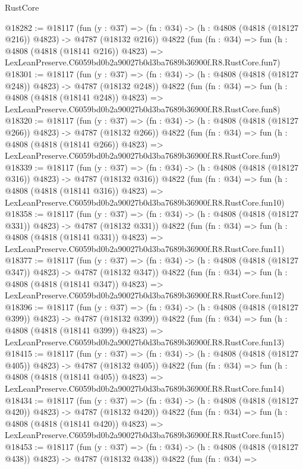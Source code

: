 \begin{lexlean}{RustCore}
\begin{coremodule}
@18282 := @18117
    (fun (y : @37) => (fn : @34) -> (h : @4808 (@4818 (@18127 @216)) @4823) -> @4787 (@18132 @216))
    @4822
    (fun (fn : @34) =>
    fun (h : @4808 (@4818 (@18141 @216)) @4823) =>
    LexLeanPreserve.C6059bd0b2a90027b0d3ba7689b36900f.R8.RustCore.fun7)
@18301 := @18117
    (fun (y : @37) => (fn : @34) -> (h : @4808 (@4818 (@18127 @248)) @4823) -> @4787 (@18132 @248))
    @4822
    (fun (fn : @34) =>
    fun (h : @4808 (@4818 (@18141 @248)) @4823) =>
    LexLeanPreserve.C6059bd0b2a90027b0d3ba7689b36900f.R8.RustCore.fun8)
@18320 := @18117
    (fun (y : @37) => (fn : @34) -> (h : @4808 (@4818 (@18127 @266)) @4823) -> @4787 (@18132 @266))
    @4822
    (fun (fn : @34) =>
    fun (h : @4808 (@4818 (@18141 @266)) @4823) =>
    LexLeanPreserve.C6059bd0b2a90027b0d3ba7689b36900f.R8.RustCore.fun9)
@18339 := @18117
    (fun (y : @37) => (fn : @34) -> (h : @4808 (@4818 (@18127 @316)) @4823) -> @4787 (@18132 @316))
    @4822
    (fun (fn : @34) =>
    fun (h : @4808 (@4818 (@18141 @316)) @4823) =>
    LexLeanPreserve.C6059bd0b2a90027b0d3ba7689b36900f.R8.RustCore.fun10)
@18358 := @18117
    (fun (y : @37) => (fn : @34) -> (h : @4808 (@4818 (@18127 @331)) @4823) -> @4787 (@18132 @331))
    @4822
    (fun (fn : @34) =>
    fun (h : @4808 (@4818 (@18141 @331)) @4823) =>
    LexLeanPreserve.C6059bd0b2a90027b0d3ba7689b36900f.R8.RustCore.fun11)
@18377 := @18117
    (fun (y : @37) => (fn : @34) -> (h : @4808 (@4818 (@18127 @347)) @4823) -> @4787 (@18132 @347))
    @4822
    (fun (fn : @34) =>
    fun (h : @4808 (@4818 (@18141 @347)) @4823) =>
    LexLeanPreserve.C6059bd0b2a90027b0d3ba7689b36900f.R8.RustCore.fun12)
@18396 := @18117
    (fun (y : @37) => (fn : @34) -> (h : @4808 (@4818 (@18127 @399)) @4823) -> @4787 (@18132 @399))
    @4822
    (fun (fn : @34) =>
    fun (h : @4808 (@4818 (@18141 @399)) @4823) =>
    LexLeanPreserve.C6059bd0b2a90027b0d3ba7689b36900f.R8.RustCore.fun13)
@18415 := @18117
    (fun (y : @37) => (fn : @34) -> (h : @4808 (@4818 (@18127 @405)) @4823) -> @4787 (@18132 @405))
    @4822
    (fun (fn : @34) =>
    fun (h : @4808 (@4818 (@18141 @405)) @4823) =>
    LexLeanPreserve.C6059bd0b2a90027b0d3ba7689b36900f.R8.RustCore.fun14)
@18434 := @18117
    (fun (y : @37) => (fn : @34) -> (h : @4808 (@4818 (@18127 @420)) @4823) -> @4787 (@18132 @420))
    @4822
    (fun (fn : @34) =>
    fun (h : @4808 (@4818 (@18141 @420)) @4823) =>
    LexLeanPreserve.C6059bd0b2a90027b0d3ba7689b36900f.R8.RustCore.fun15)
@18453 := @18117
    (fun (y : @37) => (fn : @34) -> (h : @4808 (@4818 (@18127 @438)) @4823) -> @4787 (@18132 @438))
    @4822
    (fun (fn : @34) =>

\end{coremodule}
\end{lexlean}
